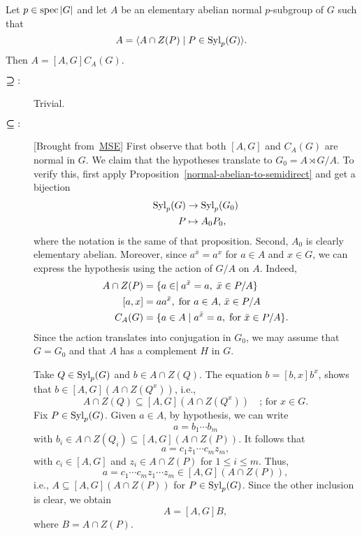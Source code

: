 \begin{exr}
    Let\/ $p \in \operatorname{spec}|G|$ and\/ let $A$ be an elementary abelian normal\/ $p$-subgroup of\/ $G$ such that
    $$
        A = \langle A\cap Z(P)\mid P\in{\rm Syl}_p(G)\rangle.
    $$
    Then\/ $A=[A,G]C_A(G)$.
\end{exr}

\begin{solution}
\begin{description}
    \item[$\textrm{\boldmath$\supseteq$}:$] Trivial.
    \item[$\textrm{\boldmath$\subseteq$}:$] {[Brought from~\href{https://math.stackexchange.com/a/1525723/269050}{MSE}]} First observe that both $[A,G]$ and $C_A(G)$ are normal in $G$. We claim that the hypotheses translate to $G_0=A\rtimes G/A$. To verify this, first apply Proposition~\ref{normal-abelian-to-semidirect} and get a bijection
    \begin{align*}
        {\rm Syl}_p(G) &\to {\rm Syl}_p(G_0)\\
        P&\mapsto A_0P_0,
    \end{align*}
    where the notation is the same of that proposition. Second, $A_0$ is clearly elementary abelian. Moreover, since $a^{\bar x}=a^x$ for $a\in A$ and $x\in G$, we can express the hypothesis using the action of $G/A$ on $A$. Indeed,
    \begin{align*}
        A\cap Z(P) &= \{a\in\mid a^{\bar x}=a,\;\bar x\in P/A\}\\
        [a,x] &= aa^{\bar x},\;\text{for }a\in A,\,\bar x\in P/A\\
        C_A(G) &= \{a\in A\mid a^{\bar x}=a,\;\text{for }\bar x\in P/A\}.
    \end{align*}
    Since the action translates into conjugation in $G_0$, we may assume that $G=G_0$ and that $A$ has a complement $H$ in $G$.
    
    Take $Q\in{\rm Syl}_p(G)$ and $b\in A\cap Z(Q)$. The equation $b=[b,x]b^x$, shows that $b\in[A,G](A\cap Z(Q^x))$, i.e.,
    $$
        A\cap Z(Q)\subseteq[A,G](A\cap Z(Q^x))\quad\text{; for }x\in G.
    $$
    Fix $P\in{\rm Syl}_p(G)$. Given $a\in A$, by hypothesis, we can write
    $$
        a = b_1\cdots b_m
    $$
    with $b_i\in A\cap Z(Q_i)\subseteq[A,G](A\cap Z(P))$. It follows that
    $$
        a = c_1z_1\cdots c_mz_m,
    $$
    with $c_i\in[A,G]$ and $z_i\in A\cap Z(P)$ for $1\le i\le m$. Thus,
    $$
        a = c_1\cdots c_mz_1\cdots z_m\in[A,G](A\cap Z(P)),
    $$
    i.e., $A\subseteq[A,G](A\cap Z(P))$ for $P\in{\rm Syl}_p(G)$. Since the other inclusion is clear, we obtain
    $$
        A = [A,G]B,
    $$
    where $B=A\cap Z(P)$.
    

\end{description}
\end{solution}
